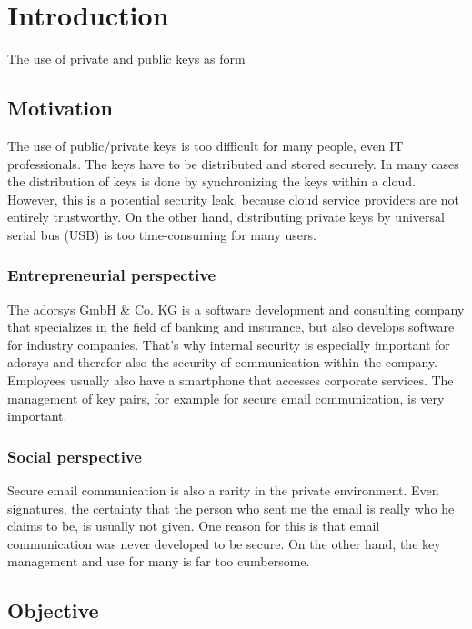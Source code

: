 \documentclass[12pt,twoside,a4paper,parskip]{scrbook}
\begin{document}
\mainmatter

\chapter{Introduction}\label{ch:intro}

The use of private and public keys as form 

\section{Motivation}

The use of public/private keys is too difficult for many people, even IT professionals. The keys have to be distributed and stored securely. In many cases the distribution of keys is done by synchronizing the keys within a cloud. However, this is a potential security leak, because cloud service providers are not entirely trustworthy. On the other hand, distributing private keys
by universal serial bus (USB) is too time-consuming for many users.

\subsection{Entrepreneurial perspective}

The adorsys GmbH \& Co. KG is a software development and consulting company that specializes in the field of banking and insurance, but also develops software for industry companies. That's why internal security is especially important for adorsys and therefor also the security of communication within the company. Employees usually also have a smartphone that accesses corporate services. The management of key pairs, for example for secure email communication, is very important. 

\subsection{Social perspective}

Secure email communication is also a rarity in the private environment. Even signatures, the certainty that the person who sent me the email is really who he claims to be, is usually not given. 
One reason for this is that email communication was never developed to be secure. On the other hand, the key management and use for many is far too cumbersome. 

\section{Objective}
\end{document}

